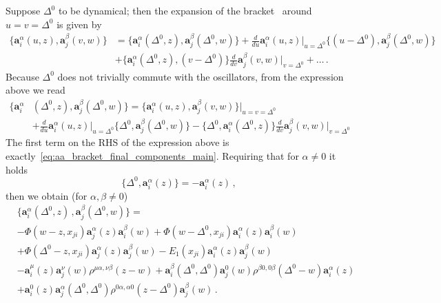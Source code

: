 Suppose $\Delta^0$ to be dynamical; then the expansion of the bracket~ around $u=v=\Delta^0$ is given by
\begin{equation}
\begin{split}
\{\mathbf{a}_i^\alpha(u,z), \mathbf{a}_j^\beta(v,w) \} &=\{\mathbf{a}_i^\alpha(\Delta^0,z), \mathbf{a}_j^\beta(\Delta^0,w) \} + \frac{d}{du} \mathbf{a}_i^\alpha(u,z)\bigl|_{u=\Delta^0} \{(u-\Delta^0), \mathbf{a}_j^\beta(\Delta^0,w) \}\\
&+  \{\mathbf{a}_i^\alpha(\Delta^0,z), (v-\Delta^0) \} \frac{d}{dv} \mathbf{a}_j^\beta(v,w)\bigl|_{v=\Delta^0} + \dots \,.
\end{split}
\end{equation}
Because $\Delta^0$ does not trivially commute with the oscillators, from the expression above we read
\begin{equation}
\begin{split}
\{\mathbf{a}_i^\alpha&(\Delta^0,z), \mathbf{a}_j^\beta(\Delta^0,w) \} =\{\mathbf{a}_i^\alpha(u,z), \mathbf{a}_j^\beta(v,w) \}\bigr|_{u=v=\Delta^0} \\
&+ \frac{d}{du} \mathbf{a}_i^\alpha(u,z)\bigl|_{u=\Delta^0} \{\Delta^0, \mathbf{a}_j^\beta(\Delta^0,w) \}- \{ \Delta^0,\mathbf{a}_i^\alpha(\Delta^0,z) \} \frac{d}{dv} \mathbf{a}_j^\beta(v,w)\bigl|_{v=\Delta^0}
\end{split}
\end{equation}
The first term on the RHS of the expression above is exactly~\eqref{eq:aa_bracket_final_components_main}.
Requiring that for $\alpha \ne 0$ it holds
\begin{equation}
\label{eq:D1_a_comm_main}
\{\Delta^0, \mathbf{a}_i^\alpha(z) \} = - \mathbf{a}_i^\alpha(z) \,,
\end{equation}
then we obtain (for $\alpha, \beta \ne 0$)
\begin{equation}
\label{eq:aa_bracket_final_components_main_dyn}
\begin{split}
&\{\mathbf{a}_i^\alpha(\Delta^0,z) \,,\mathbf{a}_j^\beta(\Delta^0,w) \}=\\
&  -  \Phi(w-z, x_{ji})\mathbf{a}_j^\alpha(z) \mathbf{a}_i^\beta(w) +  \Phi(w-\Delta^0, x_{ji})\mathbf{a}_i^\alpha(z) \mathbf{a}_i^\beta(w)\\
&+  \Phi(\Delta^0-z, x_{ji})\mathbf{a}_j^\alpha(z) \mathbf{a}_j^\beta(w)- E_1(x_{ji})\mathbf{a}_i^\alpha(z) \mathbf{a}_j^\beta(w)\\
&- \mathbf{a}_i^\mu(z)\mathbf{a}_j^\nu(w) \rho^{\mu \alpha, \nu \beta}(z-w) +\mathbf{a}_i^\beta (\Delta^0,\Delta^0)\mathbf{a}_j^0(w)   \rho^{\beta 0, 0 \beta}(\Delta^0-w) \mathbf{a}_i^\alpha( z)\\
&+ \mathbf{a}_i^0 (z)\mathbf{a}_j^\alpha(\Delta^0,\Delta^0)   \rho^{0 \alpha, \alpha 0}(z-\Delta^0) \mathbf{a}_j^\beta(w)\,.
\end{split}
\end{equation}
